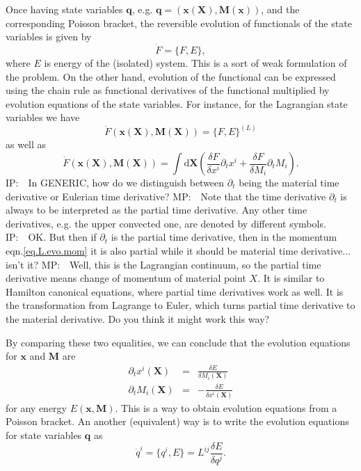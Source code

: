 \documentclass[
10pt, %
a4paper, %
oneside, %
headinclude,footinclude, %
BCOR5mm, %
]{scrartcl}
\newcommand{\xx}{\mathbf{x}}
\newcommand{\XX}{\mathbf{X}}
\newcommand{\dX}{\mathrm{d}\XX}
\newcommand{\MM}{\mathbf{M}}
\newcommand{\qq}{\mathbf{q}}
\newcommand{\MP}[1]{{\color{Green}MP:\ \ #1}}
\newcommand{\IP}[1]{{\color{Red}IP:\ \ #1}}
\newcommand{\pd}{\partial}
\begin{document}
Once having state variables $\qq$, e.g. $\qq=(\xx(\XX),\MM(\xx))$, and the corresponding Poisson bracket, the reversible evolution of functionals of the state variables is given by 
\begin{equation}
	\dot{F} = \{F,E\},
\end{equation}
where $E$ is energy of the (isolated) system. This is a sort of weak formulation of the problem. On the other hand, evolution of the functional can be expressed using the chain rule as functional derivatives of the functional multiplied by evolution equations of the state variables. For instance, for the Lagrangian state variables we have 
\begin{equation}
	\dot{F}(\xx(\XX),\MM(\XX)) = \{F,E\}^{(L)}
\end{equation}
as well as
\begin{equation}
	\dot{F}(\xx(\XX),\MM(\XX)) = \int\dX \left(\frac{\delta F}{\delta x^i} \partial_t x^i + \frac{\delta F}{\delta M_i} \partial_t M_i \right).
\end{equation}
\IP{In GENERIC, how do we distinguish between $ \pd_t $ being the material time derivative or 
Eulerian time 
derivative?}
\MP{Note that the time derivative $\partial_t$ is always to be interpreted as the partial time derivative. Any other time derivatives, e.g. the upper convected one, are denoted by different symbols.}
\IP{OK. But then if $\pd_t$ is the partial time derivative, then in the momentum eqn.\eqref{eq.L.evo.mom} it is also partial while it should be material time derivative... isn't it?}
\MP{Well, this is the Lagrangian continuum, so the partial time derivative means change of momentum of material point $X$. It is similar to Hamilton canonical equations, where partial time derivatives work as well. It is the transformation from Lagrange to Euler, which turns partial time derivative to the material derivative. Do you think it might work this way?}

By comparing these two equalities, we can conclude that the evolution equations for $\xx$ and $\MM$ are
\begin{subequations}\label{eq.L.evo}
	\begin{eqnarray}
		\partial_t x^i(\XX) &=& \frac{\delta E}{\delta M_i(\XX)}\\
		\partial_t M_i(\XX) &=& -\frac{\delta E}{\delta x^i(\XX)}\label{eq.L.evo.mom}
	\end{eqnarray}
\end{subequations}
	for any energy $E(\xx,\MM)$. 
This is a way to obtain evolution equations from a Poisson bracket. An another (equivalent) way is 
to write the evolution equations for state variables $\qq$ as
\begin{equation}\label{eq.qL}
	\dot{q}^i = \{q^i, E\} = L^{ij} \frac{\delta E}{\delta q^j}.
\end{equation}
\end{document}
